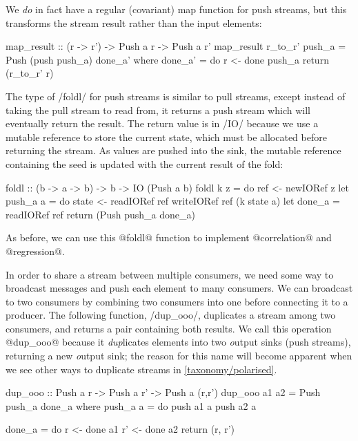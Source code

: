 We \emph{do} in fact have a regular (covariant) map function for push streams, but this transforms the stream result rather than the input elements:
\newpage

\begin{haskell}
map_result :: (r -> r') -> Push a r -> Push a r'
map_result r_to_r' push_a = Push (push push_a) done_a'
 where
  done_a' = do
    r <- done push_a
    return (r_to_r' r)
\end{haskell}

The type of \Hs/foldl/ for push streams is similar to pull streams, except instead of taking the pull stream to read from, it returns a push stream which will eventually return the result.
The return value is in \Hs/IO/ because we use a mutable reference to store the current state, which must be allocated before returning the stream.
As values are pushed into the sink, the mutable reference containing the seed is updated with the current result of the fold:

\begin{haskell}
foldl :: (b -> a -> b) -> b -> IO (Push a b)
foldl k z = do
  ref <- newIORef z
  let push_a a = do
       state <- readIORef ref
       writeIORef ref (k state a)
  let done_a = readIORef ref
  return (Push push_a done_a)
\end{haskell}

As before, we can use this @foldl@ function to implement @correlation@ and @regression@.

In order to share a stream between multiple consumers, we need some way to broadcast messages and push each element to many consumers.
We can broadcast to two consumers by combining two consumers into one before connecting it to a producer.
The following function, \Hs/dup_ooo/, duplicates a stream among two consumers, and returns a pair containing both results.
We call this operation @dup_ooo@ because it \emph{dup}licates elements into two \emph{o}utput sinks (push streams), returning a new \emph{o}utput sink; the reason for this name will become apparent when we see other ways to duplicate streams in \cref{taxonomy/polarised}.

\begin{haskell}
dup_ooo :: Push a r -> Push a r' -> Push a (r,r')
dup_ooo a1 a2 = Push push_a done_a
 where
  push_a a = do
    push a1 a
    push a2 a

  done_a = do
    r  <- done a1
    r' <- done a2
    return (r, r')
\end{haskell}

